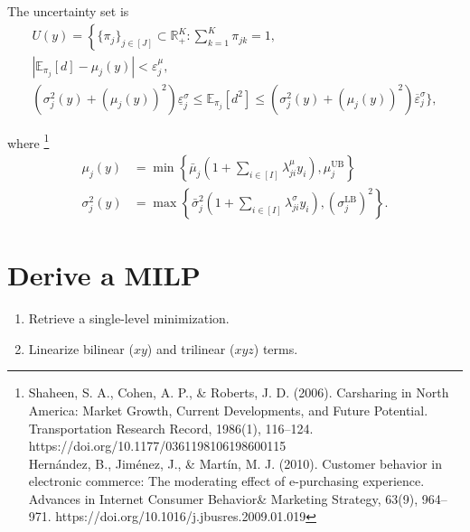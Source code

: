 \documentclass{beamer}
\newcommand{\R}{\mathbb{R}}
\newcommand{\E}{\mathbb{E}}
\begin{document}
\begin{frame}[allowframebreaks]
	\begin{definition}
		The uncertainty set is
		\begin{equation*}
			\begin{split}
				U(y) = \left\{\{\pi_j\}_{j \in [J]} \subset \R_+^{K} : \sum_{k=1}^{K} \pi_{jk} = 1, \right.\\
				\left|\E_{\pi_j}[d] - \mu_j(y)\right| < \varepsilon_j^\mu, \\
				\left(\sigma_j^2(y) + (\mu_j(y))^2\right)\underline{\varepsilon}_j^\sigma \le
				\E_{\pi_j}[d^2] \le \left(\sigma_j^2(y) + (\mu_j(y))^2\right)\overline{\varepsilon}_j^\sigma \Bigg\},
			\end{split}
		\end{equation*}
	\end{definition}
	
	\framebreak
	\begin{definition}
		where \footnote{\tiny Shaheen, S. A., Cohen, A. P., \& Roberts, J. D. (2006). Carsharing in North America: Market Growth, Current Developments, and Future Potential. Transportation Research Record, 1986(1), 116–124. https://doi.org/10.1177/0361198106198600115
		\\ Hernández, B., Jiménez, J., \& Martín, M. J. (2010). Customer behavior in electronic commerce: The moderating effect of e-purchasing experience. Advances in Internet Consumer Behavior\& Marketing Strategy, 63(9), 964–971. https://doi.org/10.1016/j.jbusres.2009.01.019
		}
		\begin{align*}
			\mu_j(y) &= \min\left\{\bar{\mu}_j \left(1 + \sum_{i \in [I]} \lambda_{ji}^\mu y_i\right), \mu_j^{\mathrm{UB}}\right\} \\
			\sigma_j^2(y) &= \max\left\{\bar{\sigma}_j^2 \left(1 + \sum_{i \in [I]} \lambda_{ji}^\sigma y_i\right), (\sigma_j^{\mathrm{LB}})^2\right\}.
		\end{align*}
	\end{definition}
\end{frame}

\section{Derive a MILP} %
\begin{frame}
	\begin{enumerate}
		\item Retrieve a single-level minimization.
		\item Linearize bilinear ($xy$) and trilinear ($xyz$) terms.
	\end{enumerate}
\end{frame}
\end{document}

